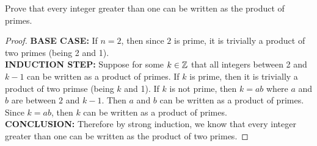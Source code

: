 \begin{problem}
    Prove that every integer greater than one can be written as the product of primes.

    \begin{proof}
        \textbf{BASE CASE:} If $n = 2$, then since $2$ is prime, it is trivially a product of two primes (being 2 and 1).\\

        \textbf{INDUCTION STEP:} Suppose for some $k \in \mathbb{Z}$ that all integers between 2 and $k-1$ can be written as a product of primes. If $k$ is prime, then it is trivially a product of two primse (being $k$ and 1). If $k$ is not prime, then $k = ab$ where $a$ and $b$ are between $2$ and $k-1$. Then $a$ and $b$ can be written as a product of primes. Since $k=ab$, then $k$ can be written as a product of primes. \\

        \textbf{CONCLUSION:} Therefore by strong induction, we know that every integer greater than one can be written as the product of two primes.
    \end{proof}
\end{problem}



